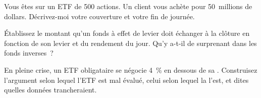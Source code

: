 \begin{interviewq}\label{iq:m1:exchange-traded-funds:4}
Vous êtes  sur un ETF de 500 actions. Un client vous achète pour
50~millions de dollars. Décrivez-moi votre couverture et votre fin de journée.
\end{interviewq}

\begin{interviewq}\label{iq:m1:exchange-traded-funds:5}
Établissez le montant qu'un fonds à effet de levier doit échanger à la clôture en fonction
de son levier et du rendement du jour. Qu'y a-t-il de surprenant dans les fonds inverses~?
\end{interviewq}

\begin{interviewq}\label{iq:m1:exchange-traded-funds:6}
En pleine crise, un ETF obligataire se négocie 4~\% en dessous de sa . Construisez l'argument selon lequel l'ETF est
mal évalué, celui selon lequel la  l'est, et dites quelles données trancheraient.
\end{interviewq}
